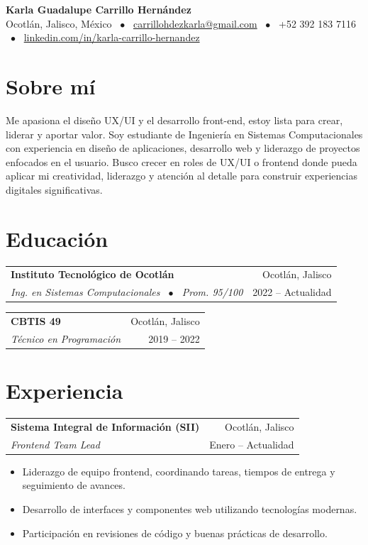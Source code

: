 \documentclass[10pt,letterpaper]{article}
\makeatletter
\newcommand{\resumeEntry}[4]{
  \vspace{3pt}
  \noindent
  \begin{tabular*}{\textwidth}[t]{l@{\extracolsep{\fill}}r}
    \textbf{#1} & \small\color{secondary}#2 \\
    \textit{#3} & \small\color{secondary}#4 \\
  \end{tabular*}
  \vspace{-3pt}
}
\makeatother
\begin{document}
\begin{center}
  {\Huge \bfseries \color{primary} Karla Guadalupe Carrillo Hernández} \\
  \vspace{6pt}
  \small
  Ocotlán, Jalisco, México \ $\bullet$ \ 
  \href{mailto:carrillohdezkarla@gmail.com}{carrillohdezkarla@gmail.com} \ $\bullet$ \ 
  +52 392 183 7116 \ $\bullet$ \ 
  \href{https://linkedin.com/in/karla-carrillo-hernandez}{linkedin.com/in/karla-carrillo-hernandez}
\end{center}

\section{Sobre mí}
\vspace{1pt}
Me apasiona el diseño UX/UI y el desarrollo front-end, estoy lista para crear, liderar y aportar valor. Soy estudiante de Ingeniería en Sistemas Computacionales con experiencia en diseño de aplicaciones, desarrollo web y liderazgo de proyectos enfocados en el usuario. Busco crecer en roles de UX/UI o frontend donde pueda aplicar mi creatividad, liderazgo y atención al detalle para construir experiencias digitales significativas.

\section{Educación}

\resumeEntry{Instituto Tecnológico de Ocotlán}{Ocotlán, Jalisco}{Ing. en Sistemas Computacionales \ $\bullet$ \ Prom. 95/100}{2022 -- Actualidad}

\resumeEntry{CBTIS 49}{Ocotlán, Jalisco}{Técnico en Programación}{2019 -- 2022}

\section{Experiencia}

\resumeEntry{Sistema Integral de Información (SII)}{Ocotlán, Jalisco}{Frontend Team Lead}{Enero -- Actualidad}
\begin{itemize}[leftmargin=12pt, noitemsep, topsep=1pt]
  \item Liderazgo de equipo frontend, coordinando tareas, tiempos de entrega y seguimiento de avances.
  \item Desarrollo de interfaces y componentes web utilizando tecnologías modernas.
  \item Participación en revisiones de código y buenas prácticas de desarrollo.
\end{itemize}
\end{document}
